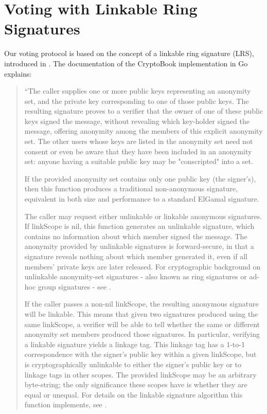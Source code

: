 \section{Voting with Linkable Ring Signatures}
Our voting protocol is based on the concept of a linkable ring signature (LRS),
introduced in \cite{lrs}. The documentation of the CryptoBook implementation in
Go explains:
\begin{quote}
 ``The caller supplies one or more public keys representing an anonymity set, and
 the private key corresponding to one of those public keys. The resulting
 signature proves to a verifier that the owner of one of these public keys
 signed the message, without revealing which key-holder signed the message,
 offering anonymity among the members of this explicit anonymity set. The other
 users whose keys are listed in the anonymity set need not consent or even be
 aware that they have been included in an anonymity set: anyone having a
 suitable public key may be "conscripted" into a set.

If the provided anonymity set contains only one public key (the signer's), then
this function produces a traditional non-anonymous signature, equivalent in both
size and performance to a standard ElGamal signature.

The caller may request either unlinkable or linkable anonymous signatures. If
linkScope is nil, this function generates an unlinkable signature, which
contains no information about which member signed the message. The anonymity
provided by unlinkable signatures is forward-secure, in that a signature reveals
nothing about which member generated it, even if all members' private keys are
later released. For cryptographic background on unlinkable anonymity-set
signatures - also known as ring signatures or ad-hoc group signatures - see
\cite{rs}.

If the caller passes a non-nil linkScope, the resulting anonymous signature will
be linkable. This means that given two signatures produced using the same
linkScope, a verifier will be able to tell whether the same or different
anonymity set members produced those signatures. In particular, verifying a
linkable signature yields a linkage tag. This linkage tag has a 1-to-1
correspondence with the signer's public key within a given linkScope, but is
cryptographically unlinkable to either the signer's public key or to linkage
tags in other scopes. The provided linkScope may be an arbitrary byte-string;
the only significance these scopes have is whether they are equal or unequal.
For details on the linkable signature algorithm this function implements, see
\cite{lrs}.


\end{quote}
